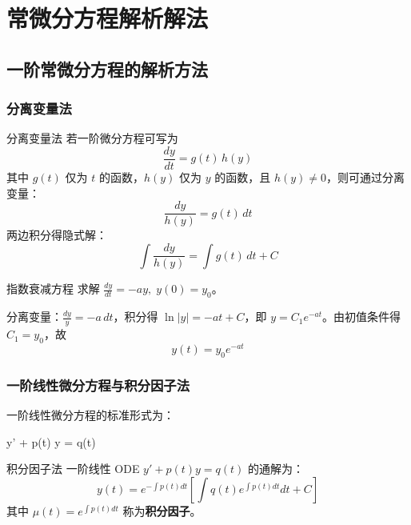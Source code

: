 \chapter{常微分方程解析解法}


\section{一阶常微分方程的解析方法}

\subsection{分离变量法}

\begin{theorem}{分离变量法}
	若一阶微分方程可写为
	\[
	\frac{dy}{dt} = g(t) \, h(y)
	\]
	其中 $g(t)$ 仅为 $t$ 的函数，$h(y)$ 仅为 $y$ 的函数，且 $h(y) \neq 0$，则可通过分离变量：
	\[
	\frac{dy}{h(y)} = g(t) \, dt
	\]
	两边积分得隐式解：
	\[
	\int \frac{dy}{h(y)} = \int g(t) \, dt + C
	\]
\end{theorem}

\begin{example}{指数衰减方程}
	求解 $\displaystyle \frac{dy}{dt} = -a y, \; y(0) = y_0$。
\end{example}

\begin{solution}
	分离变量：$\displaystyle \frac{dy}{y} = -a \, dt$，积分得 $\ln |y| = -a t + C$，即 $y = C_1 e^{-a t}$。由初值条件得 $C_1 = y_0$，故
	\[
	y(t) = y_0 e^{-a t}
	\]
\end{solution}

\subsection{一阶线性微分方程与积分因子法}

一阶线性微分方程的标准形式为：
\begin{myformula}
	y' + p(t) y = q(t)
\end{myformula}

\begin{theorem}{积分因子法}
	一阶线性 ODE $y' + p(t) y = q(t)$ 的通解为：
	\[
	y(t) = e^{-\int p(t) dt} \left[ \int q(t) e^{\int p(t) dt} dt + C \right]
	\]
	其中 $\mu(t) = e^{\int p(t) dt}$ 称为\textbf{积分因子}。
\end{theorem}

